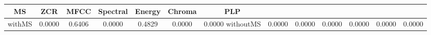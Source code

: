 \begin{tabular}{|c|c|c|c|c|c|c} \hline 
MS &ZCR &MFCC &Spectral &Energy &Chroma &PLP \\ \hline
withMS&0.0000&0.6406&0.0000&0.4829&0.0000&0.0000\hline
withoutMS&0.0000&0.0000&0.0000&0.0000&0.0000&0.0000\hline
\end{tabular}
